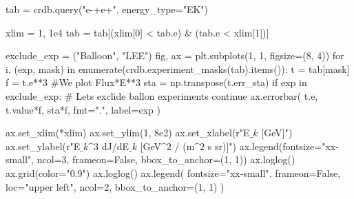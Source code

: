 \documentclass[
  letterpaper,
  DIV=11,
  numbers=noendperiod]{scrreprt}
\newenvironment{Shaded}{\begin{snugshade}}{\end{snugshade}}
\newcommand{\BuiltInTok}[1]{\textcolor[rgb]{0.00,0.23,0.31}{#1}}
\newcommand{\CommentTok}[1]{\textcolor[rgb]{0.37,0.37,0.37}{#1}}
\newcommand{\ControlFlowTok}[1]{\textcolor[rgb]{0.00,0.23,0.31}{#1}}
\newcommand{\DecValTok}[1]{\textcolor[rgb]{0.68,0.00,0.00}{#1}}
\newcommand{\FloatTok}[1]{\textcolor[rgb]{0.68,0.00,0.00}{#1}}
\newcommand{\KeywordTok}[1]{\textcolor[rgb]{0.00,0.23,0.31}{#1}}
\newcommand{\NormalTok}[1]{\textcolor[rgb]{0.00,0.23,0.31}{#1}}
\newcommand{\OperatorTok}[1]{\textcolor[rgb]{0.37,0.37,0.37}{#1}}
\newcommand{\StringTok}[1]{\textcolor[rgb]{0.13,0.47,0.30}{#1}}
\newcommand{\VariableTok}[1]{\textcolor[rgb]{0.07,0.07,0.07}{#1}}
\newcommand{\VerbatimStringTok}[1]{\textcolor[rgb]{0.13,0.47,0.30}{#1}}
\begin{document}
\begin{Shaded}
\begin{Highlighting}[]
\NormalTok{tab }\OperatorTok{=}\NormalTok{ crdb.query(}\StringTok{"e{-}+e+"}\NormalTok{, energy\_type}\OperatorTok{=}\StringTok{"EK"}\NormalTok{)}

\NormalTok{xlim }\OperatorTok{=} \DecValTok{1}\NormalTok{, }\FloatTok{1e4}
\NormalTok{tab }\OperatorTok{=}\NormalTok{ tab[(xlim[}\DecValTok{0}\NormalTok{] }\OperatorTok{\textless{}}\NormalTok{ tab.e) }\OperatorTok{\&}\NormalTok{ (tab.e }\OperatorTok{\textless{}}\NormalTok{ xlim[}\DecValTok{1}\NormalTok{])]}

\NormalTok{exclude\_exp }\OperatorTok{=}\NormalTok{ (}\StringTok{"Balloon"}\NormalTok{, }\StringTok{"LEE"}\NormalTok{)}
\NormalTok{fig, ax }\OperatorTok{=}\NormalTok{ plt.subplots(}\DecValTok{1}\NormalTok{, }\DecValTok{1}\NormalTok{, figsize}\OperatorTok{=}\NormalTok{(}\DecValTok{8}\NormalTok{, }\DecValTok{4}\NormalTok{))}
\ControlFlowTok{for}\NormalTok{ i, (exp, mask) }\KeywordTok{in} \BuiltInTok{enumerate}\NormalTok{(crdb.experiment\_masks(tab).items()):}
\NormalTok{    t }\OperatorTok{=}\NormalTok{ tab[mask]}
\NormalTok{    f }\OperatorTok{=}\NormalTok{ t.e}\OperatorTok{**}\DecValTok{3} \CommentTok{\#We plot Flux*E**3}
\NormalTok{    sta }\OperatorTok{=}\NormalTok{ np.transpose(t.err\_sta)}
    \ControlFlowTok{if}\NormalTok{ exp }\KeywordTok{in}\NormalTok{ exclude\_exp: }\CommentTok{\# Let\textquotesingle{}s exclide ballon experiments}
        \ControlFlowTok{continue}
\NormalTok{    ax.errorbar(}
\NormalTok{        t.e, t.value}\OperatorTok{*}\NormalTok{f, sta}\OperatorTok{*}\NormalTok{f, fmt}\OperatorTok{=}\StringTok{"."}\NormalTok{, label}\OperatorTok{=}\NormalTok{exp}
\NormalTok{    )}

\NormalTok{ax.set\_xlim(}\OperatorTok{*}\NormalTok{xlim)}
\NormalTok{ax.set\_ylim(}\DecValTok{1}\NormalTok{, }\FloatTok{8e2}\NormalTok{)}
\NormalTok{ax.set\_xlabel(}\VerbatimStringTok{r"E$\_k$ [GeV]"}\NormalTok{)}
\NormalTok{ax.set\_ylabel(}\VerbatimStringTok{r"E$\_k\^{}3$ dJ/dE$\_k$ [GeV$\^{}2$ / (m$\^{}2$ s sr)]"}\NormalTok{)}
\NormalTok{ax.legend(fontsize}\OperatorTok{=}\StringTok{"xx{-}small"}\NormalTok{, ncol}\OperatorTok{=}\DecValTok{3}\NormalTok{, frameon}\OperatorTok{=}\VariableTok{False}\NormalTok{, bbox\_to\_anchor}\OperatorTok{=}\NormalTok{(}\DecValTok{1}\NormalTok{, }\DecValTok{1}\NormalTok{))}
\NormalTok{ax.loglog()}
\NormalTok{ax.grid(color}\OperatorTok{=}\StringTok{"0.9"}\NormalTok{)}
\NormalTok{ax.loglog()}
\NormalTok{ax.legend(}
\NormalTok{    fontsize}\OperatorTok{=}\StringTok{"xx{-}small"}\NormalTok{, frameon}\OperatorTok{=}\VariableTok{False}\NormalTok{, loc}\OperatorTok{=}\StringTok{"upper left"}\NormalTok{, ncol}\OperatorTok{=}\DecValTok{2}\NormalTok{, bbox\_to\_anchor}\OperatorTok{=}\NormalTok{(}\DecValTok{1}\NormalTok{, }\DecValTok{1}\NormalTok{)}
\NormalTok{)}
\end{Highlighting}
\end{Shaded}
\end{document}
